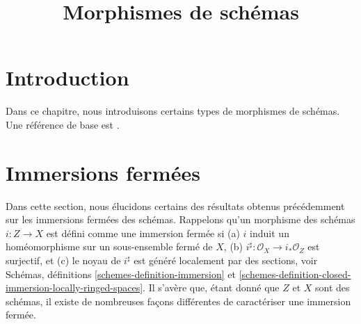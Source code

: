 

%


\title{Morphismes de schémas}


\maketitle

\label{section-phantom}

\tableofcontents

\section{Introduction}
\label{section-introduction}

\noindent
Dans ce chapitre, nous introduisons certains types de morphismes de schémas. Une référence de base est \cite{EGA}.




















\section{Immersions fermées}
\label{section-closed-immersions}

\noindent
Dans cette section, nous élucidons certains des résultats obtenus précédemment sur les immersions fermées des schémas. Rappelons qu'un morphisme des schémas $i : Z \to X$ est défini comme une immersion fermée si (a) $i$ induit un homéomorphisme sur un sous-ensemble fermé de $X$, (b) $i^\sharp : \mathcal{O}_X \to i_*\mathcal{O}_Z$ est surjectif, et (c) le noyau de $i^\sharp$ est généré localement par des sections, voir Schémas, définitions \ref{schemes-definition-immersion} et \ref{schemes-definition-closed-immersion-locally-ringed-spaces}. Il s'avère que, étant donné que $Z$ et $X$ sont des schémas, il existe de nombreuses façons différentes de caractériser une immersion fermée.

